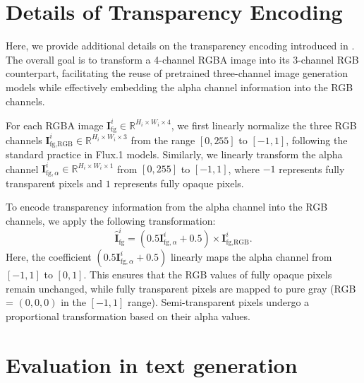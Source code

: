 \section{Details of Transparency Encoding}

Here, we provide additional details on the transparency encoding introduced in . The overall goal is to transform a 4-channel RGBA image into its 3-channel RGB counterpart, facilitating the reuse of pretrained three-channel image generation models while effectively embedding the alpha channel information into the RGB channels.


For each RGBA image $\mathbf{I}_\text{fg}^{i} \in \mathbb{R}^{H_i \times W_i \times 4}$, we first linearly normalize the three RGB channels $\mathbf{I}_{\text{fg},\text{RGB}}^{i} \in \mathbb{R}^{H_i \times W_i \times 3}$ from the range $[0, 255]$ to $[-1, 1]$, following the standard practice in Flux.1 models. Similarly, we linearly transform the alpha channel $\mathbf{I}_{\text{fg},\alpha}^{i} \in \mathbb{R}^{H_i \times W_i \times 1}$ from $[0, 255]$ to $[-1, 1]$, where $-1$ represents fully transparent pixels and $1$ represents fully opaque pixels.

To encode transparency information from the alpha channel into the RGB channels, we apply the following transformation:  
\[
\hat{\mathbf{I}}_\text{fg}^{i} = (0.5\mathbf{I}_{\text{fg},\alpha}^{i} + 0.5) \times \mathbf{I}_{\text{fg},\text{RGB}}^{i}.
\]
Here, the coefficient $(0.5\mathbf{I}_{\text{fg},\alpha}^{i} + 0.5)$ linearly maps the alpha channel from $[-1, 1]$ to $[0, 1]$. This ensures that the RGB values of fully opaque pixels remain unchanged, while fully transparent pixels are mapped to pure gray (RGB = $(0, 0, 0)$ in the $[-1, 1]$ range). Semi-transparent pixels undergo a proportional transformation based on their alpha values.



\section{Evaluation in text generation}


